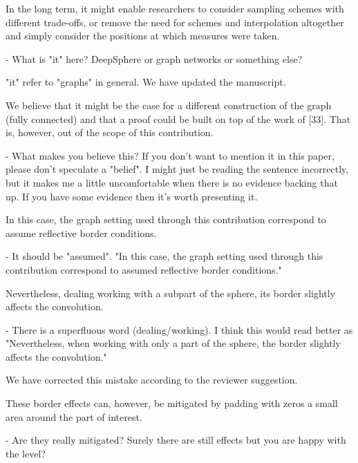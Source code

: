 \documentclass[12pt,a4paper]{article}
\newcommand{\TK}[1]{{\color{red}{TK: #1}}}
\newcommand{\todo}[1]{{\color[rgb]{.6,.1,.6}{TODO: #1}}}
\newcommand{\1}{\b{1}}              %
\newcommand{\0}{\b{0}}              %
\begin{document}
\begin{mdframed}[style=comment]
In the long term, it might enable researchers to consider sampling schemes with different trade-offs, or remove the need for schemes and interpolation altogether and simply consider the positions at which measures were taken.

- What is "it" here? DeepSphere or graph networks or something else?
\end{mdframed}
"it" refer to "graphs" in general. We have updated the manuscript.

\begin{mdframed}[style=comment]
We believe that it might be the case for a different construction of the graph (fully connected) and that a proof could be built on top of the work of [33]. That is, however, out of the scope of this contribution.

- What makes you believe this? If you don't want to mention it in this paper, please don't speculate a "belief". I might just be reading the sentence incorrectly, but it makes me a little uncomfortable when there is no evidence backing that up. If you have some evidence then it's worth presenting it.
\end{mdframed}
\todo{Assign: @nati, @michael}


\begin{mdframed}[style=comment]
In this case, the graph setting used through this contribution correspond to assume reflective border conditions.

- It should be "assumed". "In this case, the graph setting used through this contribution correspond to assumed reflective border conditions."
\end{mdframed}
\todo{@assign: Tomek}
\TK{Thank you for pointing it out, we believe that the original intended meaning is better reflected as is now.}

\begin{mdframed}[style=comment]
Nevertheless, dealing working with a subpart of the sphere, its border slightly affects the convolution.

- There is a superfluous word (dealing/working). I think this would read better as "Nevertheless, when working with only a part of the sphere, the border slightly affects the convolution."
\end{mdframed}
We have corrected this mistake according to the reviewer suggestion.

\begin{mdframed}[style=comment]
These border effects can, however, be mitigated by padding with zeros a small area around the part of interest.

- Are they really mitigated? Surely there are still effects but you are happy with the level?
\end{mdframed}
\todo{Assign: @nati, @michael}
\end{document}
